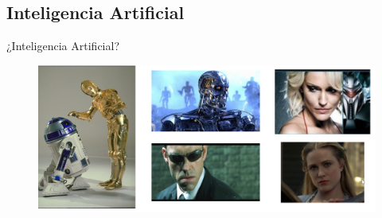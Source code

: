 \documentclass[10pt]{beamer}
\begin{document}
\subsection{Inteligencia Artificial}
\begin{frame}{¿Inteligencia Artificial?}

    \begin{figure}[!h] 
        \centering
        \includegraphics[width=1\textwidth]{img/ia1}
    \end{figure}

\end{frame}
\end{document}
